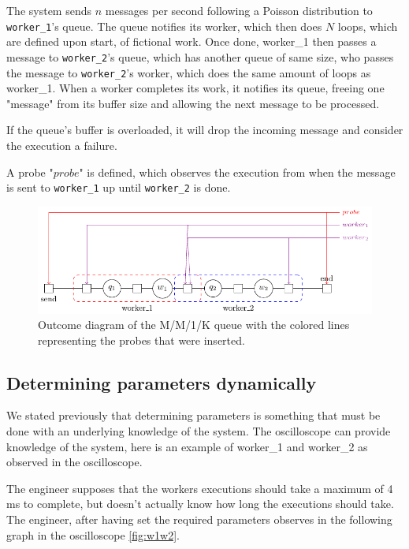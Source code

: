     The system sends $n$ messages per second following a Poisson distribution to \texttt{worker\_1}'s queue. 
    The queue notifies its worker, which then does $N$ loops, which are defined upon start, of fictional work. Once done, worker\_1 then passes a message to \texttt{worker\_2}'s queue, which has another queue of same size, who passes the message to \texttt{worker\_2}'s worker, which does the same amount of loops as worker\_1. When a worker completes its work, it notifies its queue, freeing one "message" from its buffer size and allowing the next message to be processed.
    
    If the queue's buffer is overloaded, it will drop the incoming message and consider the execution a failure.
    
    A probe "$probe$" is defined, which observes the execution from when the message is sent to \texttt{worker\_1} up until \texttt{worker\_2} is done.
    \begin{figure}[H]
        \begin{center}
            \includegraphics[scale=1.2, width=\textwidth]{tikz/mm1k.pdf} 
        \end{center}
        \caption{Outcome diagram of the M/M/1/K queue with the colored lines representing the probes that were inserted.}
        \label{fig:mm1k}
    \end{figure}

    \subsection{Determining parameters dynamically}
        We stated previously that determining parameters is something that must be done with an underlying knowledge of the system. The oscilloscope can provide knowledge of the system, here is an example of worker\_1 and worker\_2 as observed in the oscilloscope.

        The engineer supposes that the workers executions should take a maximum of 4 ms to complete, but doesn't actually know how long the executions should take. The engineer, after having set the required parameters observes in the following graph in the oscilloscope \cref{fig:w1w2}.


